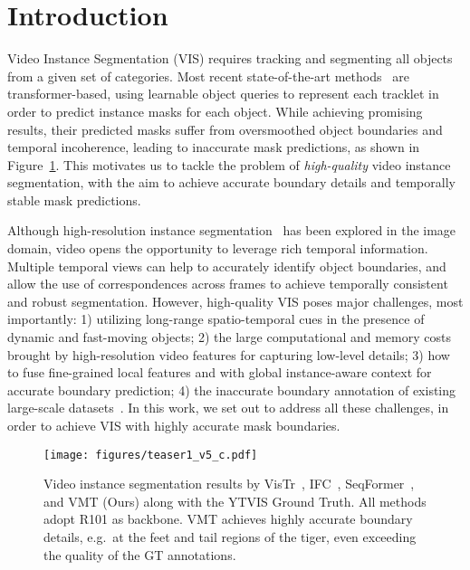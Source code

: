 \documentclass[runningheads]{llncs}
\begin{document}
\section{Introduction}













Video Instance Segmentation (VIS) requires tracking and segmenting all objects from a given set of categories. Most recent state-of-the-art methods~\cite{wang2020end,hwang2021video,Fang_2021_ICCV,wu2021seqformer} are transformer-based, using learnable object queries to represent each tracklet in order to predict instance masks for each object. While achieving promising results, their predicted masks suffer from oversmoothed object boundaries and temporal incoherence, leading to inaccurate mask predictions, as shown in Figure~\ref{fig:teaser}. This motivates us to tackle the problem of \emph{high-quality} video instance segmentation, with the aim to achieve accurate boundary details and temporally stable mask predictions. 



Although high-resolution instance segmentation~\cite{kirillov2020pointrend,transfiner} has been explored in the image domain, video opens the opportunity to leverage rich temporal information. Multiple temporal views can help to accurately identify object boundaries, and allow the use of correspondences across frames to achieve temporally consistent and robust segmentation. However, high-quality VIS poses major challenges, most importantly: 1) utilizing long-range spatio-temporal cues in the presence of dynamic and fast-moving objects; 2) the large computational and memory costs brought by high-resolution video features for capturing low-level details; 3) how to fuse fine-grained local features and with global instance-aware context for accurate boundary prediction; 4) the inaccurate boundary annotation of existing large-scale datasets~\cite{yang2019video}. In this work, we set out to address all these challenges, in order to achieve VIS with highly accurate mask boundaries.



\begin{figure}[!t]
	\centering
\texttt{[image: figures/teaser1\_v5\_c.pdf]}
\caption{Video instance segmentation results by VisTr~\cite{wang2020end}, IFC~\cite{hwang2021video}, SeqFormer~\cite{wu2021seqformer}, and VMT (Ours) along with the YTVIS Ground Truth. All methods adopt R101 as backbone. VMT achieves highly accurate boundary details, e.g.\ at the feet and tail regions of the tiger, even exceeding the quality of the GT annotations.}
\label{fig:teaser}
\end{figure}
\end{document}

